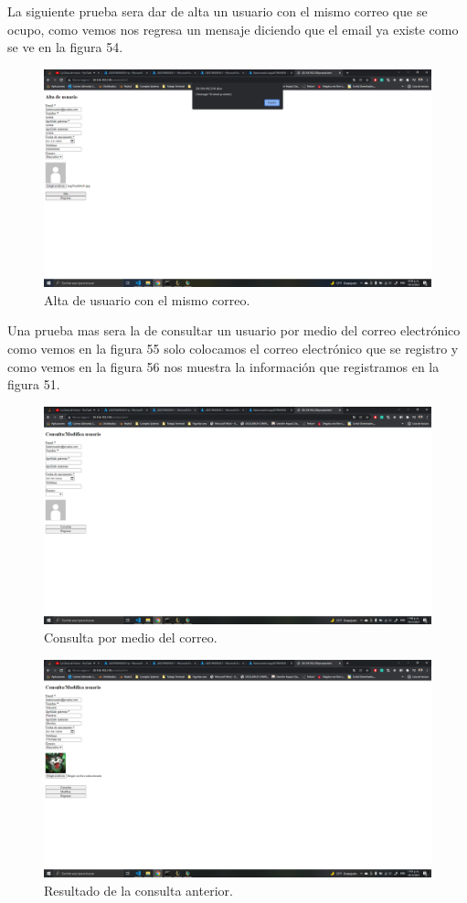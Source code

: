 \documentclass[11pt]{article}
\begin{document}
		La siguiente prueba sera dar de alta un usuario con el mismo correo que se ocupo, como vemos nos regresa un mensaje diciendo que el email ya existe como se ve en la figura 54.
		\begin{figure}[H]
			\centering
			\includegraphics[scale=0.34]{resources/prueba3.2.png}
			\caption{Alta de usuario con el mismo correo.}\label{fig:picture}
		\end{figure}
		Una prueba mas sera la de consultar un usuario por medio del correo electrónico como vemos en la figura 55 solo colocamos el correo electrónico que se registro y como vemos en la figura 56 nos muestra la información que registramos en la figura 51.
		\begin{figure}[H]
			\centering
			\includegraphics[scale=0.34]{resources/prueba4.1.png}
			\caption{Consulta por medio del correo.}\label{fig:picture}
		\end{figure}
		\begin{figure}[H]
			\centering
			\includegraphics[scale=0.34]{resources/prueba4.2.png}
			\caption{Resultado de la consulta anterior.}\label{fig:picture}
		\end{figure}
\end{document}
